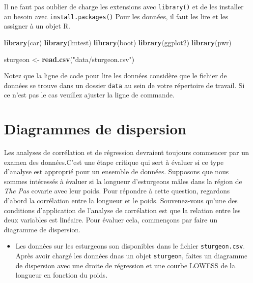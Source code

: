 \documentclass[12pt,]{book}
\makeatletter
\newenvironment{Shaded}{\begin{snugshade}}{\end{snugshade}}
\newcommand{\KeywordTok}[1]{\textcolor[rgb]{0.27,0.27,0.27}{\textbf{#1}}}
\newcommand{\NormalTok}[1]{#1}
\newcommand{\StringTok}[1]{\textcolor[rgb]{0.5,0.5,0.5}{#1}}
\providecommand{\tightlist}{%
  \setlength{\itemsep}{0pt}\setlength{\parskip}{0pt}}
\newenvironment{kframe}{%
\medskip{}
\setlength{\fboxsep}{.8em}
 \def\at@end@of@kframe{}%
 \ifinner\ifhmode%
  \def\at@end@of@kframe{\end{minipage}}%
  \begin{minipage}{\columnwidth}%
 \fi\fi%
 \def\FrameCommand##1{\hskip\@totalleftmargin \hskip-\fboxsep
 \colorbox{shadecolor}{##1}\hskip-\fboxsep
     \hskip-\linewidth \hskip-\@totalleftmargin \hskip\columnwidth}%
 \MakeFramed {\advance\hsize-\width
   \@totalleftmargin\z@ \linewidth\hsize
   \@setminipage}}%
 {\par\unskip\endMakeFramed%
 \at@end@of@kframe}
\newenvironment{rmdblock}[1]
  {
  \begin{itemize}
  \renewcommand{\labelitemi}{
    \raisebox{-.7\height}[0pt][0pt]{
      {\setkeys{Gin}{width=3em,keepaspectratio}\texttt{[image: images/\#1]}}
    }
  }
  \setlength{\fboxsep}{1em}
  \begin{kframe}
  \item
  }
  {
  \end{kframe}
  \end{itemize}
  }
\newenvironment{rmdnote}
  {\begin{rmdblock}{note}}
  {\end{rmdblock}}
\makeatother
\begin{document}
Il ne faut pas oublier de charge les extensions avec \texttt{library()} et de les installer au besoin avec \texttt{install.packages()}
Pour les données, il faut les lire et les assigner à un objet R.

\begin{Shaded}
\begin{Highlighting}[]
\KeywordTok{library}\NormalTok{(car)}
\KeywordTok{library}\NormalTok{(lmtest)}
\KeywordTok{library}\NormalTok{(boot)}
\KeywordTok{library}\NormalTok{(ggplot2)}
\KeywordTok{library}\NormalTok{(pwr)}

\NormalTok{sturgeon <-}\StringTok{ }\KeywordTok{read.csv}\NormalTok{(}\StringTok{"data/sturgeon.csv"}\NormalTok{)}
\end{Highlighting}
\end{Shaded}

\begin{rmdnote}
Notez que la ligne de code pour lire les données considère que le fichier de données se trouve dans un dossier \texttt{data} au sein de votre répertoire de travail. Si ce n'est pas le cas veuillez ajuster la ligne de commande.
\end{rmdnote}

\hypertarget{diagrammes-de-dispersion}{%
\section{Diagrammes de dispersion}\label{diagrammes-de-dispersion}}

Les analyses de corrélation et de régression devraient toujours commencer par un examen des données.C'est une étape critique qui sert à évaluer si ce type d'analyse est approprié pour un ensemble de données.
Supposons que nous sommes intéressés à évaluer si la longueur d'esturgeons mâles dans la région de \emph{The Pas} covarie avec leur poids.
Pour répondre à cette question, regardons d'abord la corrélation entre
la longueur et le poids.
Souvenez-vous qu'une des conditions d'application de l'analyse de
corrélation est que la relation entre les deux variables est linéaire. Pour
évaluer cela, commençons par faire un diagramme de dispersion.

\begin{itemize}
\tightlist
\item
  Les données sur les esturgeons son disponibles dans le fichier \texttt{sturgeon.csv}.
  Après avoir chargé les données dnas un objet \texttt{sturgeon}, faites un diagramme de dispersion avec une droite de régression et une courbe LOWESS de la longueur en fonction du poids.
\end{itemize}
\end{document}
